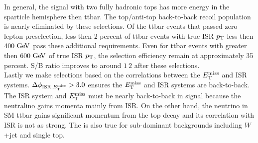 \indent In general, the signal with two fully hadronic tops has more energy in the sparticle hemisphere then ttbar.  The top/anti-top back-to-back recoil population is nearly eliminated by these selections.  Of the ttbar events that passed zero lepton preselection, less then 2 percent of ttbar events with true ISR $p_{\mathrm{T}}$ less then $400 \gev$ pass these additional requirements.   Even for ttbar events with greater then $600 \gev$ of true ISR $p_{\mathrm{T}}$, the selection efficiency remain at approximately 35 percent.  S/B ratio improves to around $1\:2$ after these selections. \\


\indent Lastly we make selections based on the correlations between the $E_{\mathrm{T}}^{\mathrm{miss}}$ and ISR systems.  $\Delta\phi_{\mathrm{ISR},E_{\mathrm{T}}^{\mathrm{miss}}} > 3.0$ ensures the $E_{\mathrm{T}}^{\mathrm{miss}}$ and ISR systems are back-to-back.  The ISR system and $E_{\mathrm{T}}^{\mathrm{miss}}$ must be nearly back-to-back in signal because the neutralino gains momenta mainly from ISR.  On the other hand, the neutrino in SM ttbar gains significant momentum from the top decay and its correlation with ISR is not as strong. The is also true for sub-dominant backgrounds including $W$+jet and single top. \\

